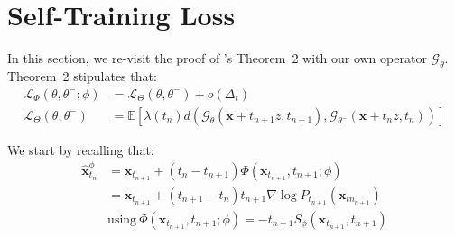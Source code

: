 \section{Self-Training Loss} \label{app:loss}

In this section, we re-visit the proof of \cite{song2023consistencymodels}'s Theorem~2 with our own operator $\mathcal{G}_{\theta}$. Theorem~2 stipulates that:
\begin{align}
    \mathcal{L}_{\Phi}\left(\theta, \theta^{-}; \phi \right) & = \mathcal{L}_{\Theta}\left(\theta, \theta^-\right) + o(\Delta_t) \\
    \mathcal{L}_{\Theta}\left(\theta, \theta^-\right) & = \mathbb{E}\left[ \lambda(t_n) d \left(\mathcal{G}_{\theta}(\mathbf{x} + t_{n+1}z, t_{n+1}), \mathcal{G}_{\theta^-}(\mathbf{x} + t_nz, t_{n}) \right)\right]
\end{align}

\noindent We start by recalling that:
\begin{align}
    \widehat{\mathbf{x}}_{t_n}^{\phi} &= \mathbf{x}_{t_{n + 1}} + (t_n - t_{n+1}) \Phi(\mathbf{x}_{t_{n+1}}, t_{n+1}; \phi) \\
     &= \mathbf{x}_{t_{n + 1}} + (t_{n+1} - t_n)t_{n+1}\nabla \log P_{t_{n+1}}(\mathbf{x}_{tn_{n+1}}) \\ 
     & \text{using} \: \Phi(\mathbf{x}_{t_{n+1}}, t_{n+1}; \phi) = -t_{n+1} S_{\phi}(\mathbf{x}_{t_{n+1}}, t_{n+1}) \label{proof:xhat}
\end{align}

